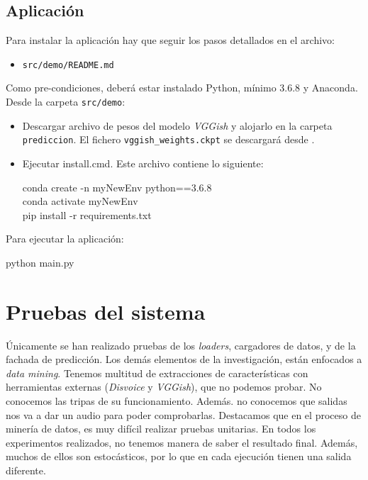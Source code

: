 \subsection{Aplicación}\label{subsec:instalar} 
Para instalar la aplicación hay que seguir los pasos detallados en el archivo:
\begin{itemize}
\item \texttt{src/demo/README.md}
\end{itemize}
Como pre-condiciones, deberá estar instalado Python, mínimo 3.6.8 y Anaconda. Desde la carpeta \texttt{src/demo}:
\begin{itemize}
\item Descargar archivo de pesos del modelo \textit{VGGish} y alojarlo en la carpeta \texttt{prediccion}. El fichero \texttt{vggish\_weights.ckpt} se descargará desde .
\item Ejecutar install.cmd. Este archivo contiene lo siguiente:
\begin{center}
conda create -n myNewEnv python==3.6.8\\
conda activate myNewEnv\\
pip install -r requirements.txt
\end{center}
\end{itemize}

Para ejecutar la aplicación:
\begin{center}
python main.py
\end{center}

\section{Pruebas del sistema}\label{sec:pruebas}
Únicamente se han realizado pruebas de los \textit{loaders}, cargadores de datos, y de la fachada de predicción. Los demás elementos de la investigación, están enfocados a \textit{data mining}. Tenemos multitud de extracciones de características con herramientas externas (\textit{Disvoice} y \textit{VGGish}), que no podemos probar. No conocemos las tripas de su funcionamiento. Además. no conocemos que salidas nos va a dar un audio para poder comprobarlas. Destacamos que en el proceso de minería de datos, es muy difícil realizar pruebas unitarias. En todos los experimentos realizados, no tenemos manera de saber el resultado final. Además, muchos de ellos son estocásticos, por lo que en cada ejecución tienen una salida diferente.

